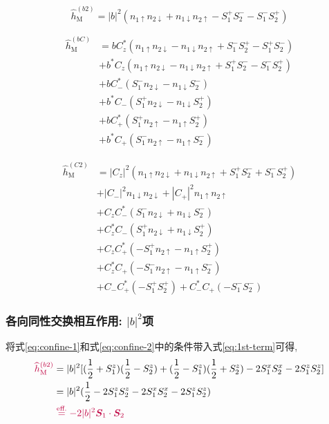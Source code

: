 \documentclass[a4paper, 12pt]{article}
\newcommand{\purple}{\textcolor{purple}}
\begin{document}
\begin{equation}\label{eq:1st-term}
  \widehat{h}_{\text{M}}^{(b2)} = |b|^2(n_{1\uparrow}n_{2\downarrow} + n_{1\downarrow}n_{2\uparrow} - S_1^+S_2^- - S_1^-S_2^+)
\end{equation}

\begin{equation}\label{eq:2nd-term}
  \begin{aligned}
    \widehat{h}_{\text{M}}^{(bC)} 
    &= bC_z^*(n_{1\uparrow}n_{2\downarrow}-n_{1\downarrow}n_{2\uparrow}+S_1^-S_2^+-S_1^+S_2^-)\\
    &+ b^*C_z(n_{1\uparrow}n_{2\downarrow}-n_{1\downarrow}n_{2\uparrow}+S_1^+S_2^--S_1^-S_2^+)\\
    &+bC_-^*(S_1^-n_{2\downarrow} - n_{1\downarrow}S_2^-)\\
    &+b^*C_-(S_1^+n_{2\downarrow} - n_{1\downarrow}S_2^+)\\
    &+bC_+^*(S_1^+n_{2\uparrow} - n_{1\uparrow}S_2^+)\\
    &+b^*C_+(S_1^-n_{2\uparrow} - n_{1\uparrow}S_2^-)
  \end{aligned}
\end{equation}

\begin{equation}\label{eq:3rd-term}
  \begin{aligned}
    \widehat{h}_{\text{M}}^{(C2)} 
    &= |C_z|^2(n_{1\uparrow}n_{2\downarrow} + n_{1\downarrow}n_{2\uparrow} + S_1^+S_2^- + S_1^-S_2^+) \\
    &+ |C_-|^2n_{1\downarrow}n_{2\downarrow} + |C_+|^2n_{1\uparrow}n_{2\uparrow}\\
    &+ C_zC_-^*(S_1^-n_{2\downarrow} + n_{1\downarrow}S_2^-)\\
    &+ C_z^*C_-(S_1^+n_{2\downarrow} + n_{1\downarrow}S_2^+)\\
    &+ C_zC_+^*(-S_1^+n_{2\uparrow} - n_{1\uparrow}S_2^+)\\
    &+ C_z^*C_+(-S_1^-n_{2\uparrow} - n_{1\uparrow}S_2^-)\\
    &+ C_-C_+^*(-S_1^+S_2^+) + C_-^*C_+(-S_1^-S_2^-)
  \end{aligned}
\end{equation}

\subsubsection{各向同性交换相互作用: \(|b|^2\)项}
将式\eqref{eq:confine-1}和式\eqref{eq:confine-2}中的条件带入式\eqref{eq:1st-term}可得, 
\begin{equation}
  \begin{aligned}
    \purple{\widehat{h}_{\text{M}}^{(b2)}} &= |b|^2[(\frac{1}{2}+S_1^z)(\frac{1}{2}-S_2^z) + (\frac{1}{2}-S_1^z)(\frac{1}{2}+S_2^z) - 2S_1^xS_2^x - 2S_1^zS_2^z]\\
    &= |b|^2(\frac{1}{2} - 2S_1^zS_2^z- 2S_1^xS_2^x - 2S_1^zS_2^z)\\
    &{}\hspace*{3pt}\purple{\overset{\text{eff.}}{=} -2|b|^2\bm{S}_1\cdot\bm{S}_2}
  \end{aligned}
\end{equation}
\end{document}
